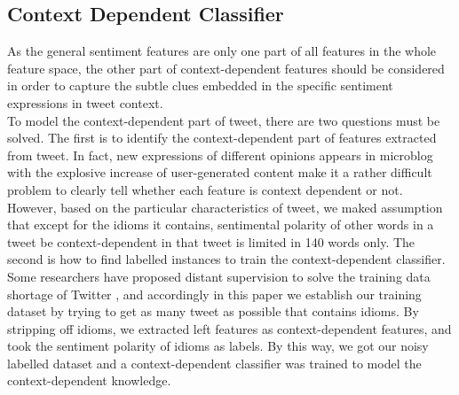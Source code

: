 \documentclass{llncs}
\begin{document}
\subsection{Context Dependent Classifier}
As the general sentiment features are only one part of all features in the whole feature space, the other part of context-dependent features should be considered in order to capture the subtle clues embedded in the specific sentiment expressions in tweet context.\\
To model the context-dependent part of tweet, there are two questions must be solved. 
The first is to identify the context-dependent part of features extracted from tweet. 
In fact, new expressions of different opinions appears in microblog with the explosive increase of user-generated content make it a rather difficult problem to clearly tell whether each feature is context dependent or not. 
However, based on the particular characteristics of tweet, we maked assumption that except for the idioms it contains, sentimental polarity of other words in a tweet be context-dependent in that tweet is limited in 140 words only. 
The second is how to find labelled instances to train the context-dependent classifier. 
Some researchers have proposed distant supervision to solve the training data shortage of Twitter \cite{xsongx:b36,xsongx:b37}, and accordingly in this paper we establish our training dataset by trying to get as many tweet as possible that contains idioms. 
By stripping off idioms, we extracted left features as context-dependent features, and took the sentiment polarity of idioms as labels. 
By this way, we got our noisy labelled dataset and a context-dependent classifier was trained to model the context-dependent knowledge.
\end{document}
